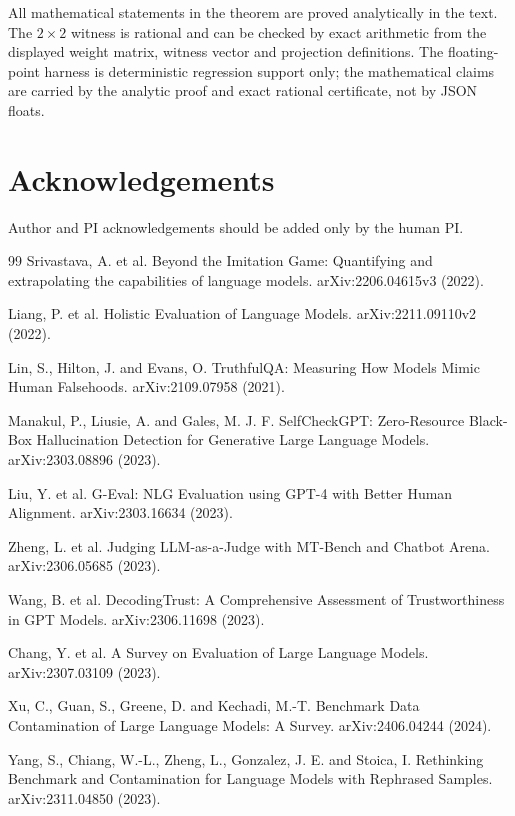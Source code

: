 \documentclass[11pt]{article}
\theoremstyle{remark}
\begin{document}
All mathematical statements in the theorem are proved analytically in the text. The $2\times2$ witness is rational and can be checked by exact arithmetic from the displayed weight matrix, witness vector and projection definitions. The floating-point harness is deterministic regression support only; the mathematical claims are carried by the analytic proof and exact rational certificate, not by JSON floats.

\section*{Acknowledgements}
Author and PI acknowledgements should be added only by the human PI.

\begin{thebibliography}{99}
Srivastava, A. et al. Beyond the Imitation Game: Quantifying and extrapolating the capabilities of language models. arXiv:2206.04615v3 (2022).

Liang, P. et al. Holistic Evaluation of Language Models. arXiv:2211.09110v2 (2022).

Lin, S., Hilton, J. and Evans, O. TruthfulQA: Measuring How Models Mimic Human Falsehoods. arXiv:2109.07958 (2021).

Manakul, P., Liusie, A. and Gales, M. J. F. SelfCheckGPT: Zero-Resource Black-Box Hallucination Detection for Generative Large Language Models. arXiv:2303.08896 (2023).

Liu, Y. et al. G-Eval: NLG Evaluation using GPT-4 with Better Human Alignment. arXiv:2303.16634 (2023).

Zheng, L. et al. Judging LLM-as-a-Judge with MT-Bench and Chatbot Arena. arXiv:2306.05685 (2023).

Wang, B. et al. DecodingTrust: A Comprehensive Assessment of Trustworthiness in GPT Models. arXiv:2306.11698 (2023).

Chang, Y. et al. A Survey on Evaluation of Large Language Models. arXiv:2307.03109 (2023).

Xu, C., Guan, S., Greene, D. and Kechadi, M.-T. Benchmark Data Contamination of Large Language Models: A Survey. arXiv:2406.04244 (2024).

Yang, S., Chiang, W.-L., Zheng, L., Gonzalez, J. E. and Stoica, I. Rethinking Benchmark and Contamination for Language Models with Rephrased Samples. arXiv:2311.04850 (2023).


\end{thebibliography}
\end{document}
